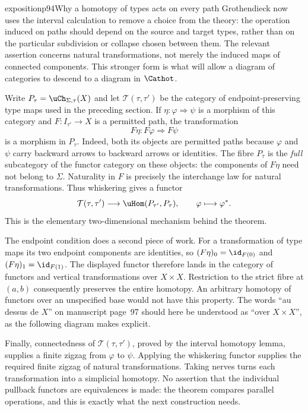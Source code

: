 \begin{dcomment}{exposition}{p94}{Why a homotopy of types acts on every path}
Grothendieck now uses the interval calculation to remove a choice from the theory: the operation induced on paths should depend on the source and target types, rather than on the particular subdivision or collapse chosen between them. The relevant assertion concerns natural transformations, not merely the induced maps of connected components. This stronger form is what will allow a diagram of categories to descend to a diagram in $\Cathot$.

Write $P_\tau=\uCh_{\Sigma,\tau}(X)$ and let $\mathcal T(\tau,\tau')$ be the category of endpoint-preserving type maps used in the preceding section. If $\eta:\varphi\Rightarrow\psi$ is a morphism of this category and $F:I_{\tau'}\to X$ is a permitted path, the transformation
\[
 F\eta:F\varphi\Longrightarrow F\psi
\]
is a morphism in $P_\tau$. Indeed, both its objects are permitted paths because $\varphi$ and $\psi$ carry backward arrows to backward arrows or identities. The fibre $P_\tau$ is the \emph{full} subcategory of the functor category on these objects: the components of $F\eta$ need not belong to $\Sigma$. Naturality in $F$ is precisely the interchange law for natural transformations. Thus whiskering gives a functor
\[
 \mathcal T(\tau,\tau')\longrightarrow\uHom(P_{\tau'},P_\tau),
 \qquad \varphi\longmapsto\varphi^*.
\]
This is the elementary two-dimensional mechanism behind the theorem.

The endpoint condition does a second piece of work. For a transformation of type maps its two endpoint components are identities, so $(F\eta)_0=\id_{F(0)}$ and $(F\eta)_1=\id_{F(1)}$. The displayed functor therefore lands in the category of functors and vertical transformations over $X\times X$. Restriction to the strict fibre at $(a,b)$ consequently preserves the entire homotopy. An arbitrary homotopy of functors over an unspecified base would not have this property. The words ``au dessus de $X$'' on manuscript page~97 should here be understood as ``over $X\times X$'', as the following diagram makes explicit.

Finally, connectedness of $\mathcal T(\tau,\tau')$, proved by the interval homotopy lemma, supplies a finite zigzag from $\varphi$ to $\psi$. Applying the whiskering functor supplies the required finite zigzag of natural transformations. Taking nerves turns each transformation into a simplicial homotopy. No assertion that the individual pullback functors are equivalences is made: the theorem compares parallel operations, and this is exactly what the next construction needs.
\end{dcomment}

